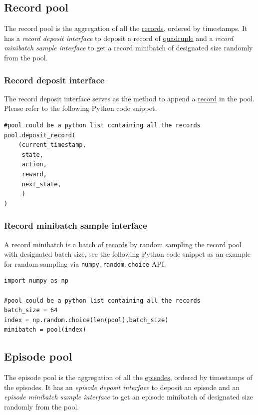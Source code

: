 \documentclass[a4paper, 11pt]{article}
\begin{document}
\subsection{Record pool\label{record_pool}}
\label{sec:org6123693}
The record pool is the aggregation of all the \hyperref[sec:orgf66f1ee]{records}, ordered by timestamps. It has a \emph{record deposit interface} to deposit a record of \hyperref[quadruple]{quadruple} and a \emph{record minibatch sample interface} to get a record minibatch of designated size randomly from the pool.
\subsubsection{Record deposit interface}
\label{sec:orgd96492b}
The record deposit interface serves as the method to append a \hyperref[sec:orgf66f1ee]{record} in the pool. Please refer to the following Python code snippet.

\begin{verbatim}
#pool could be a python list containing all the records
pool.deposit_record(
	(current_timestamp,
	 state,
	 action,
	 reward,
	 next_state,
	 )
)
\end{verbatim}
\subsubsection{Record minibatch sample interface}
\label{sec:org8a1c8aa}
A record minibatch\label{record_minibatch} is a batch of \hyperref[sec:orgf66f1ee]{records} by random sampling the record pool with designated batch size, see the following Python code snippet as an example for random sampling via \texttt{numpy.random.choice} API.

\begin{verbatim}
import numpy as np

#pool could be a python list containing all the records
batch_size = 64
index = np.random.choice(len(pool),batch_size)
minibatch = pool(index)
\end{verbatim}
\subsection{Episode pool\label{episode_pool}}
\label{sec:org777a498}
The episode pool is the aggregation of all the \hyperref[sec:org22c469d]{episodes}, ordered by timestamps of the episodes. It has an \emph{episode deposit interface} to deposit an episode and an \emph{episode minibatch sample interface} to get an episode minibatch of designated size randomly from the pool.
\end{document}
